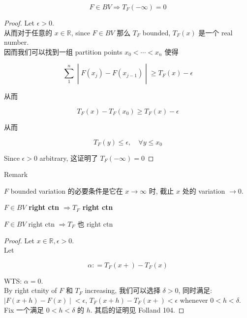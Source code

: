 \documentclass{qlnotes-export}
\begin{document}
\begin{proposition}

\[F \in BV\Longrightarrow T_{F}( - \infty) = 0\]

\end{proposition}

\begin{proof}

Let \(\epsilon > 0\).\\
从而对于任意的 \(x \in {\mathbb{R}}\), since \(F \in BV\) 那么 \(T_{F}\) bounded, \(T_{F}(x)\) 是一个 real number.\\
因而我们可以找到一组 partition points \(x_{0} < \cdots < x_{n}\) 使得

\[\left. \sum\limits_{1}^{n} \middle| F(x_{j}) - F(x_{j - 1}) \middle| \geq T_{F}(x) - \epsilon \right.\]

从而

\[T_{F}(x) - T_{F}(x_{0}) \geq T_{F}(x) - \epsilon\]

从而

\[T_{F}(y) \leq \epsilon,\quad\forall y \leq x_{0}\]

Since \(\epsilon > 0\) arbitrary, 这证明了 \(T_{F}( - \infty) = 0\)

\end{proof}

\begin{qlremark}{Remark}

\(F\) bounded variation 的必要条件是它在 \(x\rightarrow\infty\) 时, 截止 \(x\) 处的 variation \(\rightarrow 0\).

\end{qlremark}

\begin{lemma}{\protect{}\label{kn-f-in-bv-right-ctn-implies-t-f-right-ctn}{\textbf{\(F \in BV\)
right ctn \(\Longrightarrow T_{F}\) right ctn}}}

\(F \in BV\) right ctn \(\Longrightarrow T_{F}\) 也 right ctn

\end{lemma}

\begin{proof}

Let \(x \in {\mathbb{R}},\epsilon > 0\).\\
Let

\[\alpha: = T_{F}(x + ) - T_{F}(x)\]

WTS: \(\alpha = 0\).\\
By right ctnity of \(F\) 和 \(T_{F}\) increasing, 我们可以选择 \(\delta > 0\), 同时满足: \(\left. |F(x + h) - F(x) \middle| < \epsilon \right.\), \(T_{F}(x + h) - T_{F}(x + ) < \epsilon\) whenever \(0 < h < \delta\).\\
Fix 一个满足 \(0 < h < \delta\) 的 \(h\). 其后的证明见 Folland 104.

\end{proof}
\end{document}
